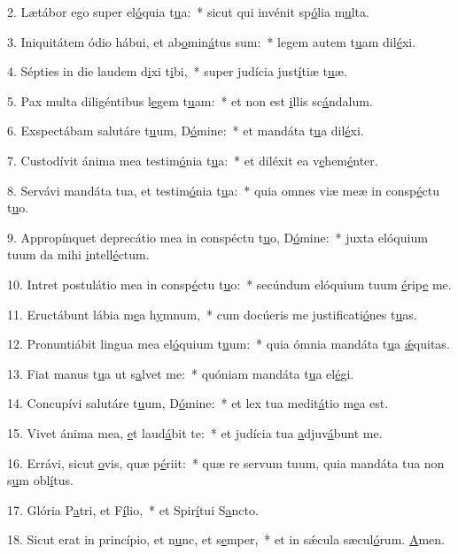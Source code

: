2. Lætábor ego super el\uline{ó}quia t\uline{u}a:~* sicut qui invénit sp\uline{ó}lia m\uline{u}lta.\par 
3. Iniquitátem ódio hábui, et ab\uline{o}min\uline{á}tus sum:~* legem autem t\uline{u}am dil\uline{é}xi.\par 
4. Sépties in die laudem d\uline{i}xi t\uline{i}bi,~* super judícia just\uline{í}tiæ t\uline{u}æ.\par 
5. Pax multa diligéntibus l\uline{e}gem t\uline{u}am:~* et non est \uline{i}llis sc\uline{á}ndalum.\par 
6. Exspectábam salutáre t\uline{u}um, D\uline{ó}mine:~* et mandáta t\uline{u}a dil\uline{é}xi.\par 
7. Custodívit ánima mea testim\uline{ó}nia t\uline{u}a:~* et diléxit ea v\uline{e}hem\uline{é}nter.\par 
8. Servávi mandáta tua, et testim\uline{ó}nia t\uline{u}a:~* quia omnes viæ meæ in consp\uline{é}ctu t\uline{u}o.\par 
9. Appropínquet deprecátio mea in conspéctu t\uline{u}o, D\uline{ó}mine:~* juxta elóquium tuum da mihi \uline{i}ntell\uline{é}ctum.\par 
10. Intret postulátio mea in consp\uline{é}ctu t\uline{u}o:~* secúndum elóquium tuum \uline{é}rip\uline{e} me.\par 
11. Eructábunt lábia m\uline{e}a h\uline{y}mnum,~* cum docúeris me justificati\uline{ó}nes t\uline{u}as.\par 
12. Pronuntiábit lingua mea el\uline{ó}quium t\uline{u}um:~* quia ómnia mandáta t\uline{u}a \uline{ǽ}quitas.\par 
13. Fiat manus t\uline{u}a ut s\uline{a}lvet me:~* quóniam mandáta t\uline{u}a el\uline{é}gi.\par 
14. Concupívi salutáre t\uline{u}um, D\uline{ó}mine:~* et lex tua medit\uline{á}tio m\uline{e}a est.\par 
15. Vivet ánima mea, \uline{e}t laud\uline{á}bit te:~* et judícia tua \uline{a}djuv\uline{á}bunt me.\par 
16. Errávi, sicut \uline{o}vis, quæ p\uline{é}riit:~* quæ re servum tuum, quia mandáta tua non s\uline{u}m obl\uline{í}tus.\par 
17. Glória P\uline{a}tri, et F\uline{í}lio,~* et Spir\uline{í}tui S\uline{a}ncto.\par 
18. Sicut erat in princípio, et n\uline{u}nc, et s\uline{e}mper,~* et in sǽcula sæcul\uline{ó}rum. \uline{A}men.\par 
